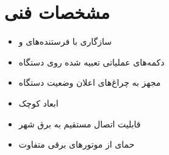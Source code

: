 % 
% 
% 
% 
% 
% 
%
\section{مشخصات فنی}

\begin{itemize}
  \item سازگاری با فرستنده‌های  و 
  \item دکمه‌های عملیاتی تعبیه شده روی دستگاه
  \item مجهز به چراغ‌های اعلان وضعیت دستگاه
  \item ابعاد کوچک
  \item قابلیت اتصال مستقیم به برق شهر
  \item حمای از موتورهای برقی متفاوت
\end{itemize}

